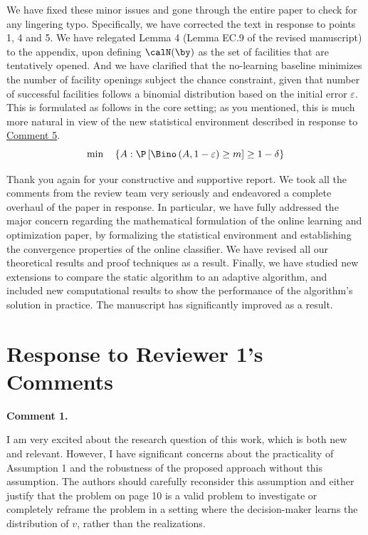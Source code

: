 \documentclass[11pt]{article}
\begin{document}
We have fixed these minor issues and gone through the entire paper to check for any lingering typo. Specifically, we have corrected the text in response to points 1, 4 and 5. We have relegated Lemma 4 (Lemma EC.9 of the revised manuscript) to the appendix, upon defining $\calN(\by)$ as the set of facilities that are tentatively opened. And we have clarified that the no-learning baseline minimizes the number of facility openings subject the chance constraint, given that number of successful facilities follows a binomial distribution based on the initial error $\varepsilon$. This is formulated as follows in the core setting; as you mentioned, this is much more natural in view of the new statistical environment described in response to \hyperref[AE:5]{\color{blue}Comment 5}.
$$\min\quad \left\{A:\P\left[\Bino\left(A, 1- \varepsilon \right)\geq m\right] \geq 1-\delta\right\}$$

\vspace{12 pt}

Thank you again for your constructive and supportive report. We took all the comments from the review team very seriously and endeavored a complete overhaul of the paper in response. In particular, we have fully addressed the major concern regarding the mathematical formulation of the online learning and optimization paper, by formalizing the statistical environment and establishing the convergence properties of the online classifier. We have revised all our theoretical results and proof techniques as a result. Finally, we have studied new extensions to compare the static algorithm to an adaptive algorithm, and included new computational results to show the performance of the algorithm's solution in practice. The manuscript has significantly improved as a result.

\newpage
\section*{Response to Reviewer 1's Comments}
%

\begin{commentBox}
\textbf{Comment 1.}\label{R1:1}

    I am very excited about the research question of this work, which is both new and relevant. However, I have significant concerns about the practicality of Assumption 1 and the robustness of the proposed approach without this assumption. The authors should carefully reconsider this assumption and either justify that the problem on page 10 is a valid problem to investigate or completely reframe the problem in a setting where the decision-maker learns the distribution of $v$, rather than the realizations.
\end{commentBox}
\end{document}
